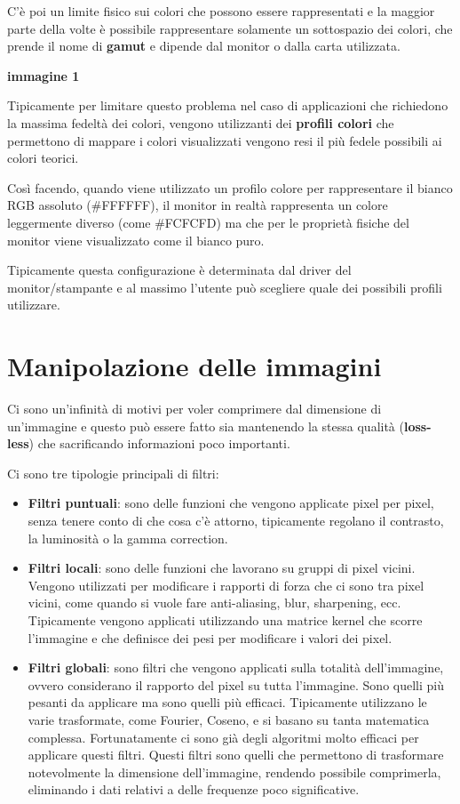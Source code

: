C'è poi un limite fisico sui colori che possono essere rappresentati e
la maggior parte della volte è possibile rappresentare solamente un
sottospazio dei colori, che prende il nome di \textbf{gamut} e dipende
dal monitor o dalla carta utilizzata.

\textbf{immagine 1}

Tipicamente per limitare questo problema nel caso di applicazioni che
richiedono la massima fedeltà dei colori, vengono utilizzanti dei
\textbf{profili colori} che permettono di mappare i colori visualizzati
vengono resi il più fedele possibili ai colori teorici.

Così facendo, quando viene utilizzato un profilo colore per
rappresentare il bianco RGB assoluto (\#FFFFFF), il monitor in realtà
rappresenta un colore leggermente diverso (come \#FCFCFD) ma che per le
proprietà fisiche del monitor viene visualizzato come il bianco puro.

Tipicamente questa configurazione è determinata dal driver del
monitor/stampante e al massimo l'utente può scegliere quale dei
possibili profili utilizzare.

\section{Manipolazione delle
immagini}\label{manipolazione-delle-immagini}

Ci sono un'infinità di motivi per voler comprimere dal dimensione di
un'immagine e questo può essere fatto sia mantenendo la stessa qualità
(\textbf{loss-less}) che sacrificando informazioni poco importanti.

Ci sono tre tipologie principali di filtri:

\begin{itemize}
\tightlist
\item
  \textbf{Filtri puntuali}: sono delle funzioni che vengono applicate
  pixel per pixel, senza tenere conto di che cosa c'è attorno,
  tipicamente regolano il contrasto, la luminosità o la gamma
  correction.
\item
  \textbf{Filtri locali}: sono delle funzioni che lavorano su gruppi di
  pixel vicini. Vengono utilizzati per modificare i rapporti di forza
  che ci sono tra pixel vicini, come quando si vuole fare anti-aliasing,
  blur, sharpening, ecc. Tipicamente vengono applicati utilizzando una
  matrice kernel che scorre l'immagine e che definisce dei pesi per
  modificare i valori dei pixel.
\item
  \textbf{Filtri globali}: sono filtri che vengono applicati sulla
  totalità dell'immagine, ovvero considerano il rapporto del pixel su
  tutta l'immagine. Sono quelli più pesanti da applicare ma sono quelli
  più efficaci. Tipicamente utilizzano le varie trasformate, come
  Fourier, Coseno, e si basano su tanta matematica complessa.
  Fortunatamente ci sono già degli algoritmi molto efficaci per
  applicare questi filtri. Questi filtri sono quelli che permettono di
  trasformare notevolmente la dimensione dell'immagine, rendendo
  possibile comprimerla, eliminando i dati relativi a delle frequenze
  poco significative.
\end{itemize}

